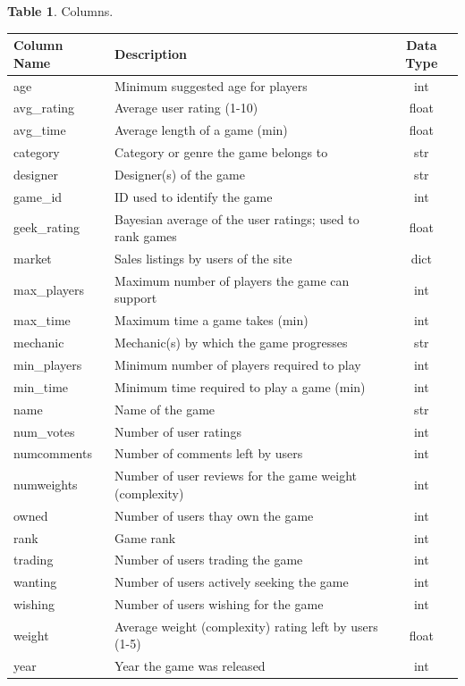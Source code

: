 \documentclass[12pt]{article}
\begin{document}
\begin{table}[ht]{\small \textbf{Table 1}. Columns.} \\
\centering
\begin{tabular*}{\textwidth}{llc}
\hline\hline
Column Name & Description & Data Type\\
\hline
age & Minimum suggested age for players & int \\
avg\_rating & Average user rating (1-10) & float \\
avg\_time & Average length of a game (min) & float \\
category & Category or genre the game belongs to & str \\
designer & Designer(s) of the game & str \\
game\_id & ID used to identify the game & int \\
geek\_rating & Bayesian average of the user ratings; used to rank games & float \\
market & Sales listings by users of the site & dict \\
max\_players & Maximum number of players the game can support & int \\
max\_time & Maximum time a game takes (min) & int \\
mechanic & Mechanic(s) by which the game progresses & str \\
min\_players & Minimum number of players required to play & int \\
min\_time & Minimum time required to play a game (min) & int \\
name & Name of the game & str \\
num\_votes & Number of user ratings & int \\
numcomments & Number of comments left by users & int \\
numweights & Number of user reviews for the game weight (complexity) & int \\
owned & Number of users thay own the game & int \\
rank & Game rank & int \\
trading & Number of users trading the game & int \\
wanting & Number of users actively seeking the game & int \\
wishing & Number of users wishing for the game & int \\
weight & Average weight (complexity) rating left by users (1-5) & float \\
year & Year the game was released & int \\
\hline
\end{tabular*}
\end{table}
\end{document}
